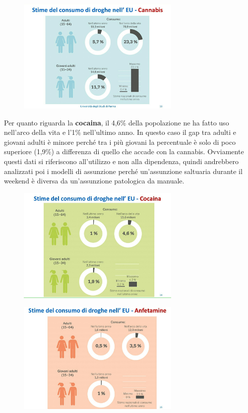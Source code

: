 \begin{figure}[!ht]
\centering
	\includegraphics[width=0.7\textwidth]{18/image2.jpeg}
\end{figure}

Per quanto riguarda la \textbf{cocaina}, il 4,6\% della popolazione ne
ha fatto uso nell'arco della vita e l'1\% nell'ultimo anno. In questo
caso il gap tra adulti e giovani adulti è minore perché tra i più
giovani la percentuale è solo di poco superiore (1,9\%) a differenza di
quello che accade con la cannabis. Ovviamente questi dati si riferiscono
all'utilizzo e non alla dipendenza, quindi andrebbero analizzati poi i
modelli di assunzione perché un'assunzione saltuaria durante il weekend
è diversa da un'assunzione patologica da manuale.

\begin{figure}[!ht]
\centering
	\includegraphics[width=0.7\textwidth]{18/image3.jpeg}
\end{figure}

\begin{figure}[!ht]
\centering
	\includegraphics[width=0.7\textwidth]{18/image4.jpeg}
\end{figure}

